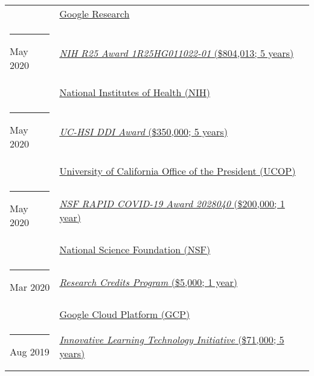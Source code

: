 \documentclass[margin,line]{res}
\begin{document}
\begin{resume}
\begin{longtable}{@{}p{0.7in}p{4in}}
\hspace*{-4mm} \hspace*{-4mm} & \hspace{4mm} \href{https://research.google/}{Google Research}\\
\hspace*{-4mm} \rule{-1mm}{5mm} May 2020 & \href{https://reporter.nih.gov/project-details/9935824}{\textit{NIH R25 Award 1R25HG011022-01} (\$804,013; 5 years)}\\*
\hspace*{-4mm} \hspace*{-4mm} & \hspace{4mm} \href{https://nih.gov}{National Institutes of Health (NIH)}\\
\hspace*{-4mm} \rule{-1mm}{5mm} May 2020 & \href{https://www.ucop.edu/graduate-studies/initiatives-outreach/uc-hsi-ddi.html}{\textit{UC-HSI DDI Award} (\$350,000; 5 years)}\\*
\hspace*{-4mm} \hspace*{-4mm} & \hspace{4mm} \href{https://www.ucop.edu/}{University of California Office of the President (UCOP)}\\
\hspace*{-4mm} \rule{-1mm}{5mm} May 2020 & \href{https://www.nsf.gov/awardsearch/showAward?AWD_ID=2028040}{\textit{NSF RAPID COVID-19 Award 2028040} (\$200,000; 1 year)}\\*
\hspace*{-4mm} \hspace*{-4mm} & \hspace{4mm} \href{https://nsf.gov}{National Science Foundation (NSF)}\\
\hspace*{-4mm} \rule{-1mm}{5mm} Mar 2020 & \href{https://edu.google.com/programs/credits/research/}{\textit{Research Credits Program} (\$5,000; 1 year)}\\*
\hspace*{-4mm} \hspace*{-4mm} & \hspace{4mm} \href{https://cloud.google.com/}{Google Cloud Platform (GCP)}\\
\hspace*{-4mm} \rule{-1mm}{5mm} Aug 2019 & \href{https://www.ucop.edu/innovative-learning-technology-initiative/}{\textit{Innovative Learning Technology Initiative} (\$71,000; 5 years)}\\*

\end{longtable}
\end{resume}
\end{document}
